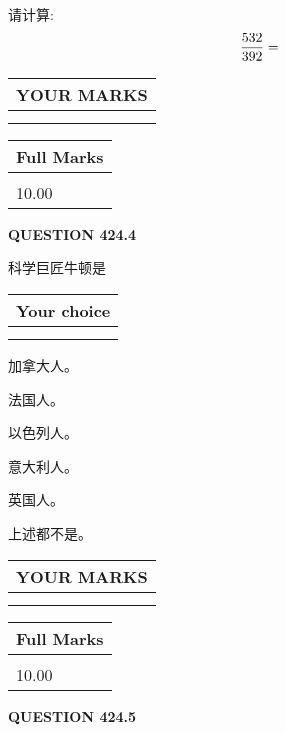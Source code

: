 \documentclass{ctexart}
\begin{document}
  
 
请计算:
\begin{equation}
\frac { %
532 }  {  %
392} = \nonumber
\end{equation}
 

 

 
  
\vspace{0.2in}
  
\noindent\begin{tabular}{|l|}
\hline
 YOUR MARKS  \\
\hline
 \\ 
 \\ 
\hline
\end{tabular}
\hspace{0.05in} \begin{tabular}{|l|}
\hline
 Full Marks  \\
\hline
 \\ 
10.00 \\
\hline
\end{tabular}
{\textbf{\Large{QUESTION
424.4 
}}}
  
  
科学巨匠牛顿是
  
  
\noindent\hspace{3.0in} \begin{tabular}{|l|}
\hline
Your choice \\
\hline
 \\ 
 \\ 
\hline
\end{tabular}
  
  
 
 
加拿大人。
 
 
法国人。
 
 
以色列人。
 
 
意大利人。
 
 
英国人。
 
 
 上述都不是。
 
 
  
\vspace{0.2in}
  
\noindent\begin{tabular}{|l|}
\hline
 YOUR MARKS  \\
\hline
 \\ 
 \\ 
\hline
\end{tabular}
\hspace{0.05in} \begin{tabular}{|l|}
\hline
 Full Marks  \\
\hline
 \\ 
10.00 \\
\hline
\end{tabular}
{\textbf{\Large{QUESTION
424.5 
}}}
  
\end{document}
